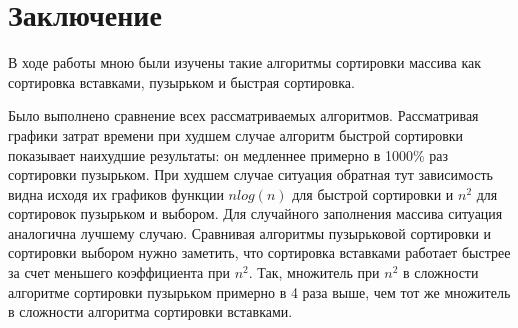 \chapter*{Заключение}



В ходе работы мною были изучены такие алгоритмы сортировки массива как сортировка вставками, пузырьком и быстрая сортировка. 

Было выполнено сравнение всех рассматриваемых алгоритмов. Рассматривая графики затрат времени при худшем случае алгоритм быстрой сортировки показывает наихудшие результаты: он медленнее примерно в 1000\% раз сортировки пузырьком. При худшем случае ситуация обратная тут зависимость видна исходя их графиков функции $nlog(n)$ для быстрой сортировки и $n^2$ для сортировок пузырьком и выбором. Для случайного заполнения массива ситуация аналогична лучшему случаю. Сравнивая алгоритмы пузырьковой сортировки и сортировки выбором нужно заметить, что сортировка вставками работает быстрее за счет меньшего коэффициента при $n^2$. Так, множитель при $n^2$ в сложности алгоритме сортировки пузырьком примерно в 4 раза выше, чем тот же множитель в сложности алгоритма сортировки вставками. 
